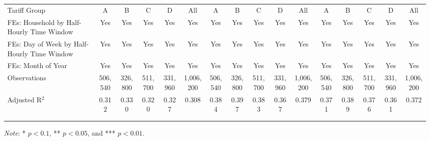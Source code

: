 {\begin{sidewaystable}[t!]
\begin{adjustbox}{scale = 0.65}
\begin{threeparttable}
\begin{tabular}{@{\extracolsep{1pt}}lccccccccccccccc}
                    Tariff Group & A & B & C & D & All & A & B & C & D & All & A & B & C & D & All \\
                    FEs: Household by Half-Hourly Time Window & Yes & Yes & Yes & Yes & Yes & Yes & Yes & Yes & Yes & Yes & Yes & Yes & Yes & Yes & Yes \\
                    FEs: Day of Week by Half-Hourly Time Window & Yes & Yes & Yes & Yes & Yes & Yes & Yes & Yes & Yes & Yes & Yes & Yes & Yes & Yes & Yes \\
                    FEs: Month of Year & Yes & Yes & Yes & Yes & Yes & Yes & Yes & Yes & Yes & Yes & Yes & Yes & Yes & Yes & Yes \\
                    Observations & 506,540 & 326,800 & 511,700 & 331,960 & 1,006,200 & 506,540 & 326,800 & 511,700 & 331,960 & 1,006,200 & 506,540 & 326,800 & 511,700 & 331,960 & 1,006,200 \\
                    Adjusted R$^{2}$ & 0.312 & 0.330 & 0.320 & 0.327 & 0.308 & 0.384 & 0.397 & 0.383 & 0.367 & 0.379 & 0.371 & 0.389 & 0.376 & 0.361 & 0.372 \\
                    \\[-2.0ex]
                    \hline \hline
                    \\[-4.5ex]
                \end{tabular}
                \begin{tablenotes}[flushleft]
                    \footnotesize
                    \item \textit{Note}: * $p < 0.1$, ** $p < 0.05$, and *** $p < 0.01$.
                \end{tablenotes}
            \end{threeparttable}
        \end{adjustbox}
    \end{sidewaystable}
}
